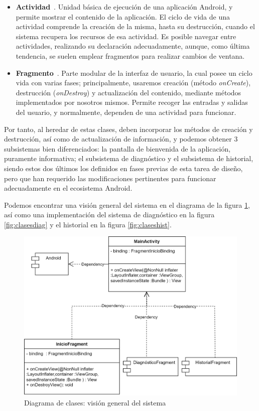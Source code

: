  \begin{itemize}
 	\item \textbf{Actividad}~\cite{actividad}. Unidad básica de ejecución de una aplicación Android, y permite mostrar el contenido de la aplicación. El ciclo de vida de una actividad comprende la creación de la misma, hasta su destrucción, cuando el sistema recupera los recursos de esa actividad. Es posible navegar entre actividades, realizando su declaración adecuadamente, aunque, como última tendencia, se suelen emplear fragmentos para realizar cambios de ventana.
 	\item \textbf{Fragmento}~\cite{fragmento}. Parte modular de la interfaz de usuario, la cual posee un ciclo vida con varias fases; principalmente, usaremos creación (método \textit{onCreate}), destrucción (\textit{onDestroy}) y actualización del contenido, mediante métodos implementados por nosotros mismos. Permite recoger las entradas y salidas del usuario, y normalmente, dependen de una actividad para funcionar.
 \end{itemize}
 
 Por tanto, al heredar de estas clases, deben incorporar los métodos de creación y destrucción, así como de actualización de información, y podemos obtener 3 subsistemas bien diferenciados: la pantalla de bienvenida de la aplicación, puramente informativa; el subsistema de diagnóstico y el subsistema de historial, siendo estos dos últimos los definidos en fases previas de esta tarea de diseño, pero que han requerido las modificaciones pertinentes para funcionar adecuadamente en el ecosistema Android.
 
 Podemos encontrar una visión general del sistema en el diagrama de la figura \ref{fig:clasesglobal}, así como una implementación del sistema de diagnóstico en la figura \ref{fig:clasesdiag} y el historial en la figura \ref{fig:claseshist}.
 
    \begin{figure}[H]
 	\centering
 	\includegraphics[scale = 0.75]{imagenes/DiagramaGeneral.png}
 	\caption{Diagrama de clases: visión general del sistema}
 	\label{fig:clasesglobal}
 \end{figure}
 
